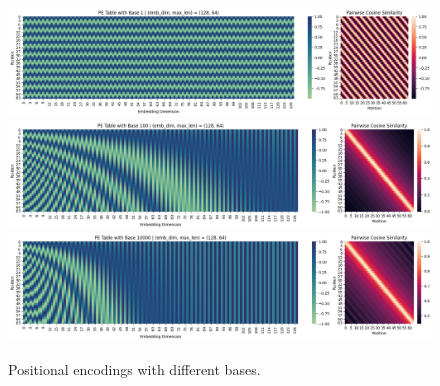 \begin{parts}
\begin{subparts}
{            \begin{figure}[H]
            \centering
            \includegraphics[width=\textwidth]{assets/pe_1.png}
            \includegraphics[width=\textwidth]{assets/pe_100.png}
            \includegraphics[width=\textwidth]{assets/pe_10000.png}
            \caption{Positional encodings with different bases.}
            \label{fig2}
            \end{figure}
            
        }
    \end{subparts}
\end{parts}








































